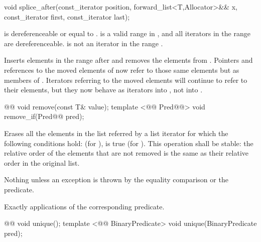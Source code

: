 \documentclass[american,twoside]{book}
\begin{document}
\begin{itemdecl}
void splice_after(const_iterator position, forward_list<T,Allocator>&& x, const_iterator first, const_iterator last);
\end{itemdecl}

\begin{itemdescr}
\pnum
\requires {} is dereferenceable or equal to .  is a valid range in , and all iterators in the range  are dereferenceable.  is not an iterator in the range .

\pnum
\effects Inserts elements in the range  after  and removes the elements from . Pointers and references to the moved elements of  now refer to those same elements but as members of . Iterators referring to the moved elements will continue to refer to their elements, but they now behave as iterators into , not into .
\end{itemdescr}

\begin{itemdecl}
@@ void remove(const T& value);
template <@@ Pred@@> void remove_if(Pred@@ pred);
\end{itemdecl}

\begin{itemdescr}
\pnum
\effects  Erases all the elements in the list referred by a list iterator  for which the following conditions hold:  (for ),  is true (for ). This operation shall be stable: the relative order of the elements that are not removed is the same as their relative order in the original list.

\pnum
\throws Nothing unless an exception is thrown by the equality comparison or the predicate.

\pnum
\complexity Exactly  applications of the corresponding predicate.
\end{itemdescr}

\begin{itemdecl}
@@ void unique();
template <@@ BinaryPredicate>
  void unique(BinaryPredicate pred);
\end{itemdecl}
\end{document}

